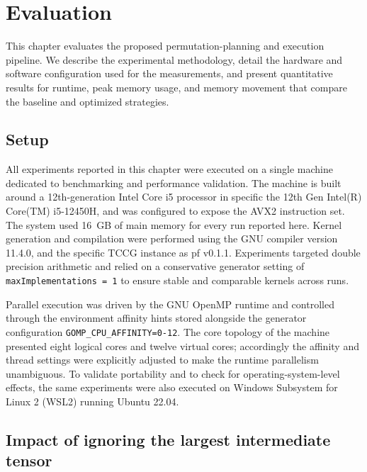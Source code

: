 
\chapter{Evaluation}\label{chapter:evaluation}

This chapter evaluates the proposed permutation-planning and execution pipeline. We describe the experimental methodology, detail the hardware and software configuration used for the measurements, and present quantitative results for runtime, peak memory usage, and memory movement that compare the baseline and optimized strategies.

\section{Setup}\label{sec:setup}

All experiments reported in this chapter were executed on a single machine dedicated to benchmarking and performance validation. The machine is built around a 12th-generation Intel Core i5 processor in specific the 12th Gen Intel(R) Core(TM) i5-12450H, and was configured to expose the AVX2 instruction set. The system used 16~GB of main memory for every run reported here. Kernel generation and compilation were performed using the GNU compiler version 11.4.0, and the specific \ac{TCCG} instance as pf v0.1.1. Experiments targeted double precision arithmetic and relied on a conservative generator setting of \texttt{maxImplementations = 1} to ensure stable and comparable kernels across runs.

Parallel execution was driven by the GNU OpenMP runtime and controlled through the environment affinity hints stored alongside the generator configuration \newline\texttt{GOMP\_CPU\_AFFINITY=0-12}. The core topology of the machine presented eight logical cores and twelve virtual cores; accordingly the affinity and thread settings were explicitly adjusted to make the runtime parallelism unambiguous. To validate portability and to check for operating-system-level effects, the same experiments were also executed on Windows Subsystem for Linux 2 (WSL2) running Ubuntu 22.04.

\section{Impact of ignoring the largest intermediate tensor}

